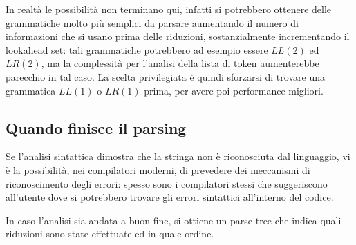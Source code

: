 \documentclass[class=book, crop=false, oneside, 12pt]{standalone}
\begin{document}
In realtà le possibilità non terminano qui, infatti si potrebbero ottenere delle grammatiche molto più semplici da parsare aumentando il numero di informazioni che si usano prima delle riduzioni, sostanzialmente incrementando il lookahead set: tali grammatiche potrebbero ad esempio essere \(LL(2)\) ed \(LR(2)\), ma la complessità per l'analisi della lista di token aumenterebbe parecchio in tal caso. La scelta privilegiata è quindi sforzarsi di trovare una grammatica \(LL(1)\) o \(LR(1)\) prima, per avere poi performance migliori.

\subsection{Quando finisce il parsing}
Se l'analisi sintattica dimostra che la stringa non è riconosciuta dal linguaggio, vi è la possibilità, nei compilatori moderni, di prevedere dei meccanismi di riconoscimento degli errori: spesso sono i compilatori stessi che suggeriscono all'utente dove si potrebbero trovare gli errori sintattici all'interno del codice.

In caso l'analisi sia andata a buon fine, si ottiene un parse tree che indica quali riduzioni sono state effettuate ed in quale ordine.
\end{document}
